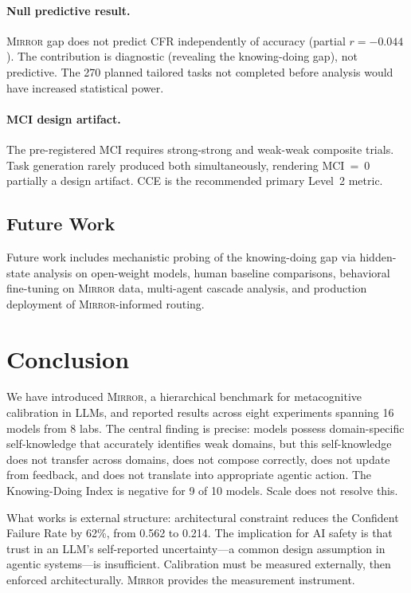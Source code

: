 \documentclass[10pt]{article}
\newcommand{\mirror}{\textsc{Mirror}}
\newcommand{\MCI}{MCI}
\newcommand{\CCE}{CCE}
\newcommand{\CFR}{CFR}
\begin{document}
\paragraph{Null predictive result.}
\mirror{} gap does not predict \CFR{} independently of accuracy
(partial $r = -0.044$). The contribution is diagnostic (revealing the
knowing-doing gap), not predictive. The 270 planned tailored tasks not completed
before analysis would have increased statistical power.

\paragraph{\MCI{} design artifact.}
The pre-registered \MCI{} requires strong-strong and weak-weak composite trials.
Task generation rarely produced both simultaneously, rendering \MCI{}~=~0 partially
a design artifact. \CCE{} is the recommended primary Level~2 metric.

\subsection{Future Work}

Future work includes mechanistic probing of the knowing-doing gap via hidden-state analysis on open-weight models, human baseline comparisons, behavioral fine-tuning on \mirror{} data, multi-agent cascade analysis, and production deployment of \mirror{}-informed routing.

\section{Conclusion}
\label{sec:conclusion}

We have introduced \mirror{}, a hierarchical benchmark for metacognitive
calibration in LLMs, and reported results across eight experiments spanning 16
models from 8 labs. The central finding is precise: models possess domain-specific
self-knowledge that accurately identifies weak domains, but this self-knowledge
does not transfer across domains, does not compose correctly, does not update from
feedback, and does not translate into appropriate agentic action. The Knowing-Doing
Index is negative for 9 of 10 models. Scale does not resolve this.

What works is external structure: architectural constraint reduces the Confident
Failure Rate by 62\%, from 0.562 to 0.214. The implication for AI safety is that
trust in an LLM's self-reported uncertainty---a common design assumption in agentic
systems---is insufficient. Calibration must be measured externally, then enforced
architecturally. \mirror{} provides the measurement instrument.
\end{document}
